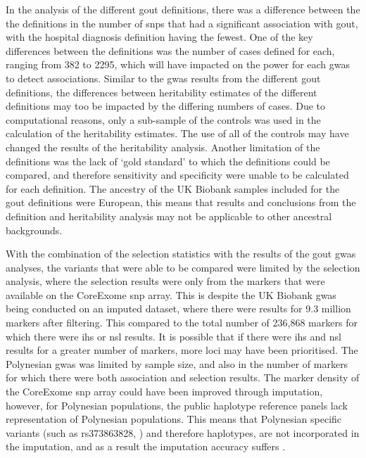 \documentclass[twoside,openright]{report}
\begin{document}
In the analysis of the different gout definitions, there was a
difference between the the definitions in the number of \glspl{snp} that
had a significant association with gout, with the hospital diagnosis
definition having the fewest. One of the key differences between the
definitions was the number of cases defined for each, ranging from 382
to 2295, which will have impacted on the power for each \gls{gwas} to
detect associations. Similar to the \gls{gwas} results from the
different gout definitions, the differences between heritability
estimates of the different definitions may too be impacted by the
differing numbers of cases. Due to computational reasons, only a
sub-sample of the controls was used in the calculation of the
heritability estimates. The use of all of the controls may have changed
the results of the heritability analysis. Another limitation of the
definitions was the lack of `gold standard' to which the definitions
could be compared, and therefore sensitivity and specificity were unable
to be calculated for each definition. The ancestry of the UK Biobank
samples included for the gout definitions were European, this means that
results and conclusions from the definition and heritability analysis
may not be applicable to other ancestral backgrounds.

With the combination of the selection statistics with the results of the
gout \gls{gwas} analyses, the variants that were able to be compared
were limited by the selection analysis, where the selection results were
only from the markers that were available on the CoreExome \gls{snp}
array. This is despite the UK Biobank \gls{gwas} being conducted on an
imputed dataset, where there were results for 9.3 million markers after
filtering. This compared to the total number of 236,868 markers for
which there were \gls{ihs} or \gls{nsl} results. It is possible that if
there were \gls{ihs} and \gls{nsl} results for a greater number of
markers, more loci may have been prioritised. The Polynesian \gls{gwas}
was limited by sample size, and also in the number of markers for which
there were both association and selection results. The marker density of
the CoreExome \gls{snp} array could have been improved through
imputation, however, for Polynesian populations, the public haplotype
reference panels lack representation of Polynesian populations. This
means that Polynesian specific variants (such as rs373863828,
\citet{Minster2016}) and therefore haplotypes, are not incorporated in
the imputation, and as a result the imputation accuracy suffers
\citep{Howie2011}.
\end{document}

